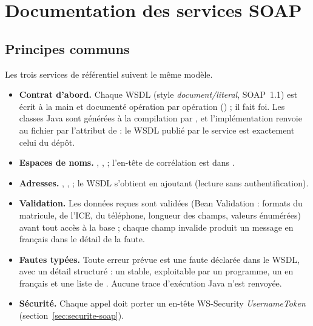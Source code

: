 \chapter{Documentation des services SOAP}\label{chap:soap}

\section{Principes communs}

Les trois services de référentiel suivent le même modèle.

\begin{itemize}
  \item \textbf{Contrat d'abord.} Chaque WSDL (style \emph{document/literal}, SOAP~1.1) est écrit à la main et documenté opération par opération () ; il fait foi. Les classes Java sont générées à la compilation par , et l'implémentation renvoie au fichier par l'attribut  de  : le WSDL publié par le service est exactement celui du dépôt.
  \item \textbf{Espaces de noms.} , ,  ; l'en-tête de corrélation est dans .
  \item \textbf{Adresses.} , ,  ; le WSDL s'obtient en ajoutant  (lecture sans authentification).
  \item \textbf{Validation.} Les données reçues sont validées (Bean Validation : formats du matricule, de l'ICE, du téléphone, longueur des champs, valeurs énumérées) avant tout accès à la base ; chaque champ invalide produit un message en français dans le détail de la faute.
  \item \textbf{Fautes typées.} Toute erreur prévue est une faute déclarée dans le WSDL, avec un détail structuré : un  stable, exploitable par un programme, un  en français et une liste de . Aucune trace d'exécution Java n'est renvoyée.
  \item \textbf{Sécurité.} Chaque appel doit porter un en-tête WS-Security \emph{UsernameToken} (section~\ref{sec:securite-soap}).
\end{itemize}

